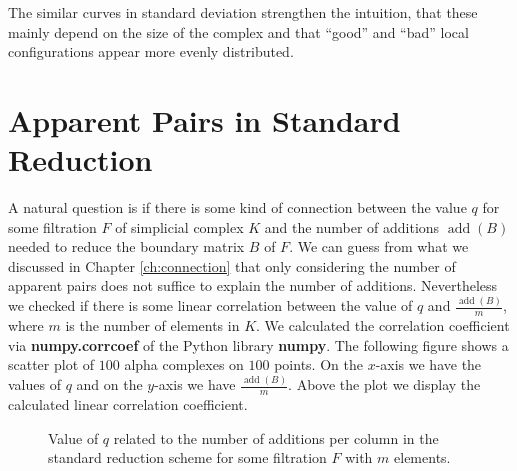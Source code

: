The similar curves in standard deviation strengthen the intuition, that these mainly depend on the size of the complex and that \enquote{good} and \enquote{bad} local configurations appear more evenly distributed. 


\section{Apparent Pairs in Standard Reduction}

A natural question is if there is some kind of connection between the value $q$ for some filtration $F$ of simplicial complex $K$ and the number of additions $\operatorname{add}(B)$ needed to reduce the boundary matrix $B$ of $F$. We can guess from what we discussed in Chapter \ref{ch:connection} that only considering the number of apparent pairs does not suffice to explain the number of additions. Nevertheless we checked if there is some linear correlation between the value of $q$ and $\frac{\operatorname{add}(B)}{m}$, where $m$ is the number of elements in $K$. We calculated the correlation coefficient via \textbf{numpy.corrcoef} of the Python library \textbf{numpy}. The following figure shows a scatter plot of $100$ alpha complexes on $100$ points. On the $x$-axis we have the values of $q$ and on the $y$-axis we have $\frac{\operatorname{add}(B)}{m}$. Above the plot we display the calculated linear correlation coefficient.

\begin{figure}[H]
\begin{subfigure}[c]{0.95\textwidth}
\begin{center}

\end{center}
\end{subfigure}
\caption{Value of $q$ related to the number of additions per column in the standard reduction scheme for some filtration $F$ with $m$ elements.}
\label{fig:correlation_3d}
\end{figure}

